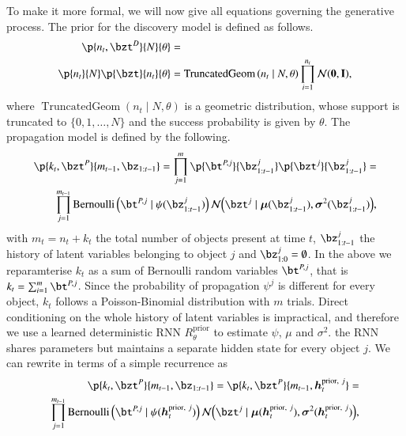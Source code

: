To make it more formal, we will now give all equations governing the generative process. The prior for the discovery model is defined as follows.
\begin{equation}
\begin{aligned}
    \p{n_t, \bzt^D}{N}{\theta} &=\\
    \p{n_t}{N} \p{\bzt}{n_t}{\theta} 
    &= \operatorname{TruncatedGeom} \left( n_t \mid N, \theta \right)
    \prod_{i=1}^{n_t} \gauss{\bf{0}, I},
\end{aligned}
\end{equation}
where $\operatorname{TruncatedGeom} \left( n_t \mid N, \theta \right)$ is a geometric distribution, whose support is truncated to $\{0, 1, \dots, N\}$ and the success probability is given by $\theta$. The propagation model is defined by the following.
\begin{equation}
\begin{aligned}
    \p{k_t, \bzt^P}{m_{t-1}, \bz_{1:t-1}} = \prod_{j=1}^m \p{\bt^{P, j}}{\bz_{1:t-1}^j} \p{\bzt^j}{\bz_{1:t-1}^j} =\\
    \prod_{j=1}^{m_{t-1}} \mathrm{Bernoulli} \left(\bt^{P, j} \mid \psi( \bz_{1:t-1}^j) \right) \gauss{\bzt^j \mid \bm{\mu} (\bz_{1:t-1}^j), \bm{\sigma}^2(\bz_{1:t-1}^j)},
\end{aligned}
\label{eq:prop_prior}
\end{equation}
with $m_t = n_t + k_t$ the total number of objects present at time $t$, $\bz_{1:t-1}^j$ the history of latent variables belonging to object $j$ and $\bz_{1:0}^j = \emptyset$. In the above we reparamterise $k_t$ as a sum of Bernoulli random variables $\bt^{P, j}$, that is $k_t = \sum_{i=1}^m \bt^{P, j}$. Since the probability of propagation $\psi^j$ is different for every object, $k_t$ follows a Poisson-Binomial distribution with $m$ trials. Direct conditioning on the whole history of latent variables is impractical, and therefore we use a learned deterministic RNN $R_\theta^\mathrm{prior}$ to estimate $\psi$, $\mu$ and $\sigma^2$. the RNN shares parameters but maintains a separate hidden state for every object $j$. We can rewrite  in terms of a simple recurrence as
\begin{equation}
\begin{aligned}
    \p{k_t, \bzt^P}{m_{t-1}, \bz_{1:t-1}} = \p{k_t, \bzt^P}{m_{t-1}, \bm{h}_t^{\mathrm{prior},\ j}} =\\
    \prod_{j=1}^{m_{t-1}} \mathrm{Bernoulli} \left(\bt^{P, j} \mid \psi( \bm{h}_t^{\mathrm{prior},\ j} ) \right) \gauss{\bzt^j \mid \bm{\mu} (\bm{h}_t^{\mathrm{prior},\ j}), \bm{\sigma}^2(\bm{h}_t^{\mathrm{prior},\ j})},
\end{aligned}
\end{equation}
